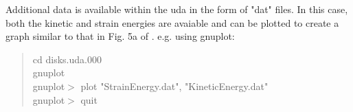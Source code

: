 \documentclass[fleqn]{article}
\begin{document}
Additional data is available within the uda in the form of "dat" files.
In this case, both the kinetic and strain energies are avaiable and can
be plotted to create a graph similar to that in Fig. 5a of \cite{sulskycmame}.
e.g. using gnuplot:

\begin{quote}
cd disks.uda.000 \\
gnuplot \\
gnuplot$>$ plot "StrainEnergy.dat", "KineticEnergy.dat" \\
gnuplot$>$ quit \\
\end{quote}


\end{document}
